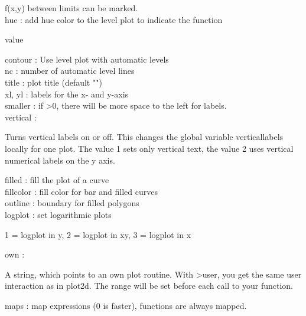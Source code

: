 \documentclass{article}
\newenvironment{eulernotebook}{\par}{\par}
\newenvironment{eulercomment}{\par\medskip}{\par\medskip}
\begin{document}
\begin{eulernotebook}
\begin{eulercomment}
\begin{eulercomment}
\begin{eulercomment}
\begin{eulercomment}
\begin{eulercomment}
f(x,y) between limits can be marked.
\\
hue       : add hue color to the level plot to indicate the function\\
\end{eulercomment}
\begin{eulerttcomment}
            value
\end{eulerttcomment}
\begin{eulercomment}
contour   : Use level plot with automatic levels\\
nc        : number of automatic level lines\\
title     : plot title (default "")\\
xl, yl    : labels for the x- and y-axis\\
smaller   : if \textgreater{}0, there will be more space to the left for labels.\\
vertical  :\\
\end{eulercomment}
\begin{eulerttcomment}
  Turns vertical labels on or off. This changes the global variable
  verticallabels locally for one plot. The value 1 sets only vertical
  text, the value 2 uses vertical numerical labels on the y axis.
\end{eulerttcomment}
\begin{eulercomment}
filled    : fill the plot of a curve\\
fillcolor : fill color for bar and filled curves\\
outline   : boundary for filled polygons\\
logplot   : set logarithmic plots\\
\end{eulercomment}
\begin{eulerttcomment}
            1 = logplot in y,
            2 = logplot in xy,
            3 = logplot in x
\end{eulerttcomment}
\begin{eulercomment}
own       :\\
\end{eulercomment}
\begin{eulerttcomment}
  A string, which points to an own plot routine. With >user, you get
  the same user interaction as in plot2d. The range will be set
  before each call to your function.
\end{eulerttcomment}
\begin{eulercomment}
maps      : map expressions (0 is faster), functions are always mapped.\\

\end{eulercomment}
\end{eulercomment}
\end{eulercomment}
\end{eulercomment}
\end{eulercomment}
\end{eulernotebook}
\end{document}
